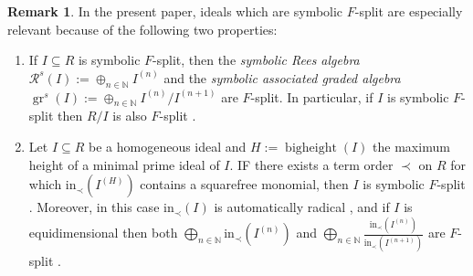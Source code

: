\documentclass[12pt]{amsart}
\theoremstyle{definition}
\newtheorem{remark}[remark]{Remark}
\newcommand{\R}[1]{R^{1/p^{#1}}}
\renewcommand{\(}{\left(}
\renewcommand{\)}{\right)}
\newcommand{\NN}{\mathbb{N} }
\newcommand{\gr}{\operatorname{gr}}
\newcommand{\bh}{\operatorname{bigheight}}
\def \R{\mathcal R}
\renewcommand{\!}[1]{{\color{red}\text{\Huge$\star$ }#1}}
\newcommand{\init}{\mathrm{in}}
\begin{document}
\begin{remark}\label{rem_impt_prop_symb}
	In the present paper, ideals which are symbolic $F$-split are especially relevant because of the following two properties:
\begin{enumerate}
\item If  $I\subseteq R$ is  symbolic $F$-split, 
then the {\it symbolic Rees algebra} $\R^s(I):=\oplus_{n\in \NN} I^{(n)}$ and the {\it symbolic associated graded algebra}   $\gr^s(I):=\oplus_{n\in \NN} I^{(n)}/I^{(n+1)}$ are $F$-split. 
In particular, if $I$ is symbolic $F$-split then  $R/I$ is also $F$-split \cite[Theorem 4.7]{DSMNB}.
\item Let  $I\subseteq R$ be a homogeneous ideal and $H:=\bh(I)$ the maximum height of a minimal prime ideal of $I$. IF there exists a term order $\prec$ on $R$ for which $\init_\prec\left(I^{(H)}\right)$ contains a squarefree monomial, then $I$ is symbolic $F$-split  \cite[Lemma 6.2(1)]{DSMNB}.  Moreover, in this case $\init_\prec(I)$ is automatically radical \cite[Theorem 3.13]{KoleyVarbaro},  and if $I$ is equidimensional then both $\bigoplus_{n\in \NN}\init_\prec(I^{(n)})$ and $\bigoplus_{n\in \NN}\frac{\init_\prec(I^{(n)})}{\init_\prec\left(I^{(n+1)}\right)}$ are $F$-split \cite[Proposition 7.5]{DSMNB}.%
\end{enumerate}
\end{remark}
\end{document}
